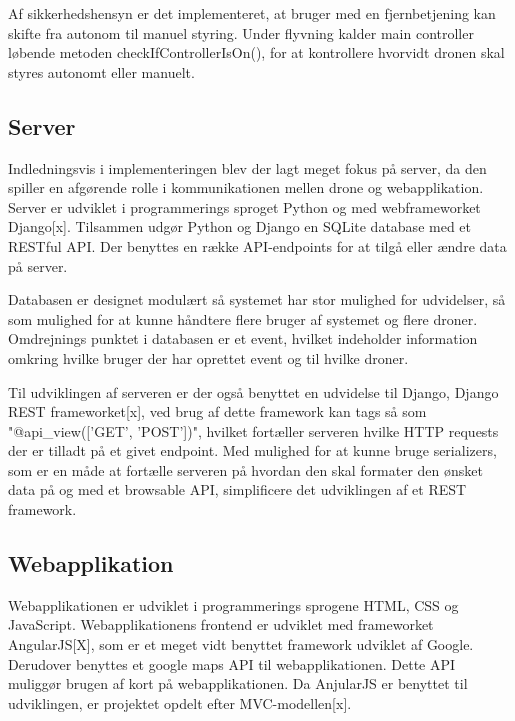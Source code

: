 Af sikkerhedshensyn er det implementeret, at bruger med en fjernbetjening kan skifte fra autonom til manuel styring. Under flyvning kalder main controller løbende metoden checkIfControllerIsOn(), for at kontrollere hvorvidt dronen skal styres autonomt eller manuelt.  

\subsection{Server}
Indledningsvis i implementeringen blev der lagt meget fokus på server, da den spiller en afgørende rolle i kommunikationen mellen drone og webapplikation. 
Server er udviklet i programmerings sproget Python og med webframeworket Django[x].
Tilsammen udgør Python og Django en SQLite database med et RESTful API. Der benyttes en række API-endpoints for at tilgå eller ændre data på server.

Databasen er designet modulært så systemet har stor mulighed for udvidelser, så som mulighed for at kunne håndtere flere bruger af systemet og flere droner. Omdrejnings punktet i databasen er et event, hvilket indeholder information omkring hvilke bruger der har oprettet event og til hvilke droner.

Til udviklingen af serveren er der også benyttet en udvidelse til Django, Django REST frameworket[x], ved brug af dette framework kan tags så som "@api\_view(['GET', 'POST'])", hvilket fortæller serveren hvilke HTTP requests der er tilladt på et givet endpoint. Med mulighed for at kunne bruge serializers, som er en måde at fortælle serveren på hvordan den skal formater den ønsket data på og med et browsable API, simplificere det udviklingen af et REST framework.

\newpage
\subsection{Webapplikation}
Webapplikationen  er udviklet i programmerings sprogene HTML, CSS og JavaScript. Webapplikationens frontend er udviklet med frameworket AngularJS[X], som er et meget vidt benyttet framework udviklet af Google. Derudover benyttes et google maps API til webapplikationen. Dette API muliggør brugen af kort på webapplikationen. Da AnjularJS er benyttet til udviklingen, er projektet opdelt efter MVC-modellen[x]. 

